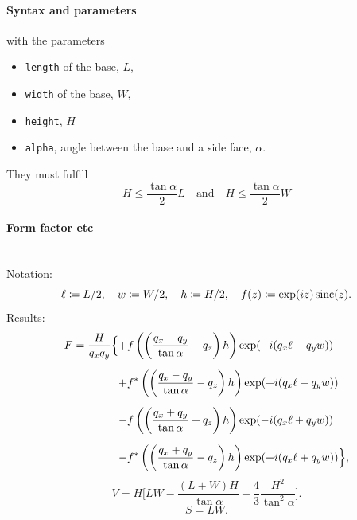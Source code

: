 \FloatBarrier

\paragraph{Syntax and parameters}
\begin{quote}
\end{quote}
with the parameters
\begin{itemize}
\item \texttt{length} of the base, $L$,
\item \texttt{width} of the base, $W$,
\item \texttt{height}, $H$
\item \texttt{alpha}, angle between the base and a side face, $\alpha$.
\end{itemize}
They must fulfill
\begin{displaymath}
  H \le \frac{\tan\alpha}{2} L
  \quad\text{and}\quad
  H \le \frac{\tan\alpha}{2} W
\end{displaymath}

\paragraph{Form factor etc}\strut\\
Notation:
\begin{displaymath}
  \ell\coloneqq L/2,\quad
  w\coloneqq W/2,\quad
  h\coloneqq H/2,\quad
  f(z)\coloneqq \exp(i z)\operatorname{sinc}(z).
\end{displaymath}
Results:
\begin{equation*}
\begin{array}{@{}l@{}l@{}}
\DS F=
\frac{H}{q_xq_y} \Big\{
   &+\DS  f\left(\left(\frac{q_x-q_y}{\tan\alpha} +q_z\right)h\right)
        \exp(-i(q_x\ell-q_y w))
\\[3.6ex]
   &\DS+ f^*\left(\left(\frac{q_x-q_y}{\tan\alpha} -q_z\right)h\right)
        \exp(+i(q_x\ell-q_y w))
\\[3.6ex]
   &\DS- f\left(\left(\frac{q_x+q_y}{\tan\alpha} +q_z\right)h\right)
        \exp(-i(q_x\ell+q_y w))
\\[3.6ex]
   &\DS- f^*\left(\left(\frac{q_x+q_y}{\tan\alpha} -q_z\right)h\right)
        \exp(+i(q_x\ell+q_y w))
\Big\},
\end{array}
\end{equation*}
\begin{equation*}
  V= H \Big[LW - \dfrac{(L + W)H}{\tan\alpha} + \dfrac{4}{3} \dfrac{H^2}{\tan^2\alpha}\Big].
\end{equation*}
\begin{equation*}
  S=LW.
\end{equation*}

